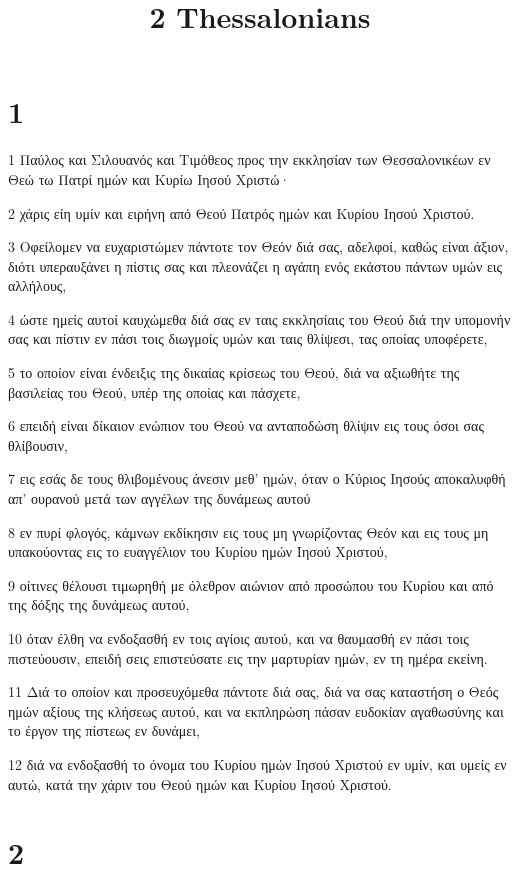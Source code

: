 

\title{2 Thessalonians}


\chapter{1}

\par 1 Παύλος και Σιλουανός και Τιμόθεος προς την εκκλησίαν των Θεσσαλονικέων εν Θεώ τω Πατρί ημών και Κυρίω Ιησού Χριστώ·
\par 2 χάρις είη υμίν και ειρήνη από Θεού Πατρός ημών και Κυρίου Ιησού Χριστού.
\par 3 Οφείλομεν να ευχαριστώμεν πάντοτε τον Θεόν διά σας, αδελφοί, καθώς είναι άξιον, διότι υπεραυξάνει η πίστις σας και πλεονάζει η αγάπη ενός εκάστου πάντων υμών εις αλλήλους,
\par 4 ώστε ημείς αυτοί καυχώμεθα διά σας εν ταις εκκλησίαις του Θεού διά την υπομονήν σας και πίστιν εν πάσι τοις διωγμοίς υμών και ταις θλίψεσι, τας οποίας υποφέρετε,
\par 5 το οποίον είναι ένδειξις της δικαίας κρίσεως του Θεού, διά να αξιωθήτε της βασιλείας του Θεού, υπέρ της οποίας και πάσχετε,
\par 6 επειδή είναι δίκαιον ενώπιον του Θεού να ανταποδώση θλίψιν εις τους όσοι σας θλίβουσιν,
\par 7 εις εσάς δε τους θλιβομένους άνεσιν μεθ' ημών, όταν ο Κύριος Ιησούς αποκαλυφθή απ' ουρανού μετά των αγγέλων της δυνάμεως αυτού
\par 8 εν πυρί φλογός, κάμνων εκδίκησιν εις τους μη γνωρίζοντας Θεόν και εις τους μη υπακούοντας εις το ευαγγέλιον του Κυρίου ημών Ιησού Χριστού,
\par 9 οίτινες θέλουσι τιμωρηθή με όλεθρον αιώνιον από προσώπου του Κυρίου και από της δόξης της δυνάμεως αυτού,
\par 10 όταν έλθη να ενδοξασθή εν τοις αγίοις αυτού, και να θαυμασθή εν πάσι τοις πιστεύουσιν, επειδή σεις επιστεύσατε εις την μαρτυρίαν ημών, εν τη ημέρα εκείνη.
\par 11 Διά το οποίον και προσευχόμεθα πάντοτε διά σας, διά να σας καταστήση ο Θεός ημών αξίους της κλήσεως αυτού, και να εκπληρώση πάσαν ευδοκίαν αγαθωσύνης και το έργον της πίστεως εν δυνάμει,
\par 12 διά να ενδοξασθή το όνομα του Κυρίου ημών Ιησού Χριστού εν υμίν, και υμείς εν αυτώ, κατά την χάριν του Θεού ημών και Κυρίου Ιησού Χριστού.

\chapter{2}

